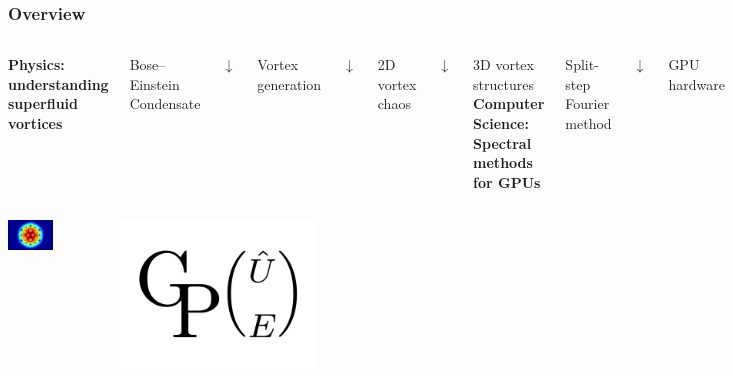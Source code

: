 \documentclass{beamer}
\begin{document}
\begin{frame}
\frametitle{Overview}
\begin{columns}
\center
\textbf{Physics: understanding superfluid vortices}

\vspace{0.5cm}

Bose--Einstein Condensate

$\downarrow$

Vortex generation

$\downarrow$

2D vortex chaos

$\downarrow$

3D vortex structures
\center
\textbf{Computer Science: Spectral methods for GPUs}

\vspace{0.5cm}

Split-step Fourier method

$\downarrow$

GPU hardware

$\downarrow$

GPUE codebase

$\downarrow$

Optimizations
\end{columns}

\begin{columns}
\begin{center}
\includegraphics[width=0.5\textwidth]{density_L10_cut.png}
\end{center}
\begin{center}
\includegraphics[width=0.5\textwidth]{GPUE.png}
\end{center}
\end{columns}

\end{frame}
\end{document}

